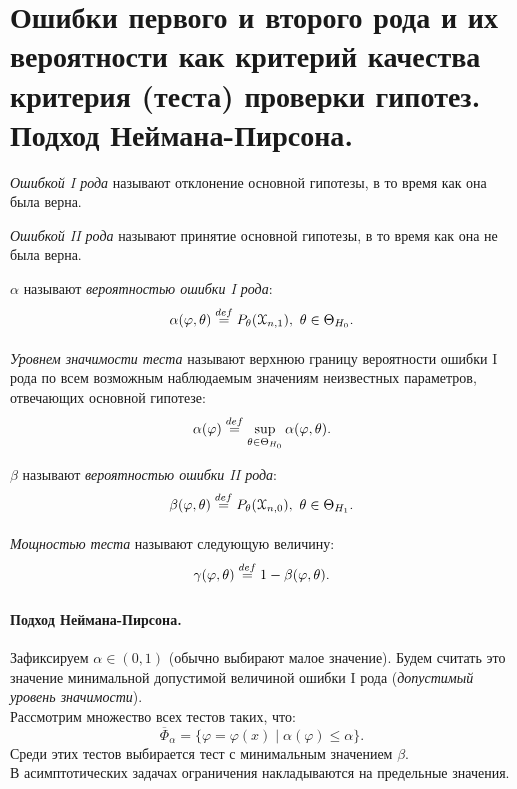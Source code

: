 \section{Ошибки первого и второго рода и их вероятности как критерий качества
критерия (теста) проверки гипотез. Подход Неймана-Пирсона.}

\begin{definition}
  \textit{Ошибкой I рода} называют отклонение основной гипотезы, в то
  время как она была верна.
\end{definition}

\begin{definition}
  \textit{Ошибкой II рода} называют принятие основной гипотезы, в то
  время как она не была верна.
\end{definition}

\begin{definition}
  $\alpha$ называют \textit{вероятностью ошибки I рода}:
  \[
    \alpha(\varphi, \theta) \overset{def}{\underset{}{=}} P_{\theta}(\mathcal{X}_{n, 1}),~
    \theta \in \Theta_{H_0}
  .\]
\end{definition}

\begin{definition}
  \textit{Уровнем значимости теста} называют верхнюю границу вероятности ошибки
  I рода по всем возможным наблюдаемым значениям неизвестных параметров,
  отвечающих основной гипотезе:
  \[
    \alpha(\varphi) \overset{def}{\underset{}{=}} \sup_{\theta \in \Theta_{H_0}} \alpha(\varphi, \theta)
  .\]
\end{definition}

\begin{definition}
  $\beta$ называют \textit{вероятностью ошибки II рода}:
  \[
    \beta(\varphi, \theta) \overset{def}{\underset{}{=}} P_{\theta}(\mathcal{X}_{n, 0}),~
    \theta \in \Theta_{H_1}
  .\]
\end{definition}

\begin{definition}
  \textit{Мощностью теста} называют следующую величину:
  \[
    \gamma(\varphi, \theta) \overset{def}{\underset{}{=}} 1 - \beta(\varphi, \theta)
  .\]
\end{definition}

\paragraph{Подход Неймана-Пирсона.}
Зафиксируем $\alpha \in (0, 1)$ (обычно выбирают малое значение). Будем считать
это значение минимальной допустимой величиной ошибки I рода (\textit{допустимый
уровень значимости}).\\
Рассмотрим множество всех тестов таких, что:
\[
  \overline{\Phi}_\alpha = \{\varphi = \varphi(x) \mid \alpha(\varphi) \leqslant
  \alpha\}
.\]
Среди этих тестов выбирается тест с минимальным значением $\beta$.\\
В асимптотических задачах ограничения накладываются на предельные значения.

